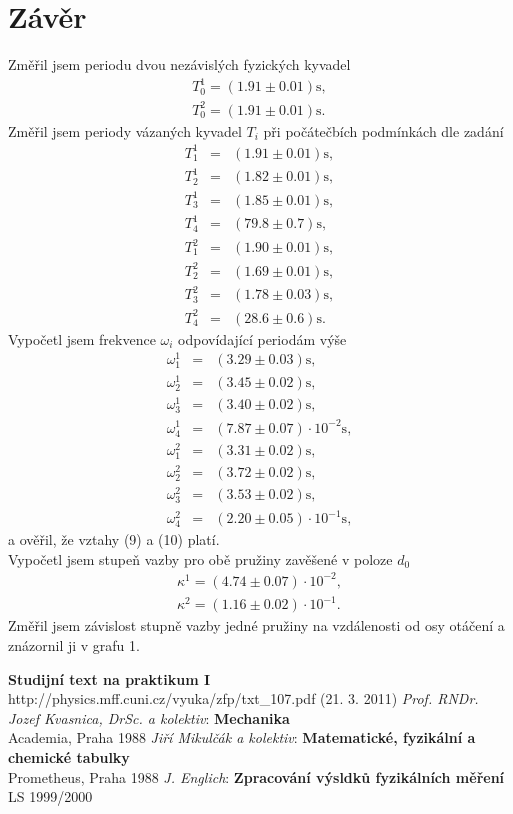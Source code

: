 \documentclass[a4paper,12pt]{article}
\begin{document}
\section{Závěr}
\noindent
Změřil jsem periodu dvou nezávislých fyzických kyvadel
\begin{eqnarray}
T_0^1=(1.91\pm 0.01)\mbox{s}, \\
T_0^2=(1.91\pm 0.01)\mbox{s}.
\end{eqnarray}
Změřil jsem periody vázaných kyvadel $T_i$ při počátečbích podmínkách dle zadání
\begin{eqnarray}
	T_1^1&=&(1.91 \pm 0.01) \mbox{s}, \\
	T_2^1&=&(1.82 \pm 0.01) \mbox{s}, \\
	T_3^1&=&(1.85 \pm 0.01) \mbox{s}, \\
	T_4^1&=&(79.8 \pm 0.7) \mbox{s}, \\
	T_1^2&=&(1.90 \pm 0.01) \mbox{s}, \\
	T_2^2&=&(1.69 \pm 0.01) \mbox{s}, \\
	T_3^2&=&(1.78 \pm 0.03) \mbox{s}, \\
	T_4^2&=&(28.6 \pm 0.6) \mbox{s}.
\end{eqnarray}
Vypočetl jsem frekvence $\omega_i$ odpovídající periodám výše
\begin{eqnarray}
	\omega_1^1&=&(3.29 \pm 0.03) \mbox{s}, \\
	\omega_2^1&=&(3.45 \pm 0.02) \mbox{s}, \\
	\omega_3^1&=&(3.40 \pm 0.02) \mbox{s}, \\
	\omega_4^1&=&(7.87 \pm 0.07)\cdot 10^{-2} \mbox{s}, \\
	\omega_1^2&=&(3.31 \pm 0.02) \mbox{s}, \\
	\omega_2^2&=&(3.72 \pm 0.02) \mbox{s}, \\
	\omega_3^2&=&(3.53 \pm 0.02) \mbox{s}, \\
	\omega_4^2&=&(2.20 \pm 0.05)\cdot 10^{-1} \mbox{s},
\end{eqnarray}
a ověřil, že vztahy (9) a (10) platí.\\
Vypočetl jsem stupeň vazby pro obě pružiny zavěšené v poloze $d_0$
\begin{eqnarray}
	\kappa^1=(4.74\pm0.07)\cdot 10^{-2}, \\
	\kappa^2=(1.16\pm0.02)\cdot 10^{-1}.
\end{eqnarray}
Změřil jsem závislost stupně vazby jedné pružiny na vzdálenosti od osy otáčení a znázornil ji v grafu 1.




\begin{thebibliography}{5}
	 \textbf{Studijní text na praktikum I} \\http://physics.mff.cuni.cz/vyuka/zfp/txt\_107.pdf (21. 3. 2011)
	 \emph{Prof. RNDr. Jozef Kvasnica, DrSc. a kolektiv}: \textbf{Mechanika}\\ Academia, Praha 1988
	 \emph{Jiří Mikulčák a kolektiv}: \textbf{Matematické, fyzikální a chemické tabulky} \\ Prometheus, Praha 1988
	 \emph{J. Englich}: \textbf{Zpracování výsldků fyzikálních měření} \\ LS 1999/2000
\end{thebibliography}
\end{document}
